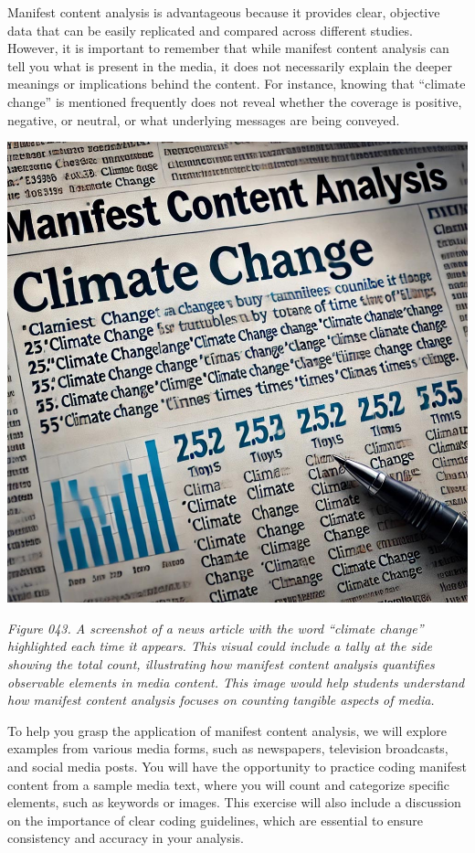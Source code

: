 \documentclass[
]{book}
\begin{document}
Manifest content analysis is advantageous because it provides clear, objective data that can be easily replicated and compared across different studies. However, it is important to remember that while manifest content analysis can tell you what is present in the media, it does not necessarily explain the deeper meanings or implications behind the content. For instance, knowing that ``climate change'' is mentioned frequently does not reveal whether the coverage is positive, negative, or neutral, or what underlying messages are being conveyed.

\includegraphics[width=1\textwidth,height=\textheight]{images/fig043.jpg}

\emph{Figure 043. A screenshot of a news article with the word ``climate change'' highlighted each time it appears. This visual could include a tally at the side showing the total count, illustrating how manifest content analysis quantifies observable elements in media content. This image would help students understand how manifest content analysis focuses on counting tangible aspects of media.}

To help you grasp the application of manifest content analysis, we will explore examples from various media forms, such as newspapers, television broadcasts, and social media posts. You will have the opportunity to practice coding manifest content from a sample media text, where you will count and categorize specific elements, such as keywords or images. This exercise will also include a discussion on the importance of clear coding guidelines, which are essential to ensure consistency and accuracy in your analysis.
\end{document}
